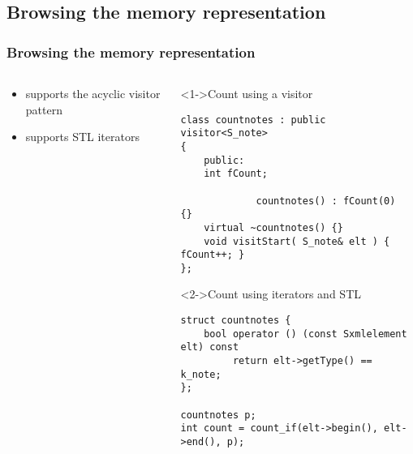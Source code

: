 \documentclass{beamer}
\begin{document}
\subsection{Browsing the memory representation}
\begin{frame}[fragile]
	\frametitle{Browsing the memory representation}

	\begin{columns}
		\begin{column}[c]{50mm}
		\begin{itemize}
			\item<1-> supports the acyclic visitor pattern
		\vspace{25mm}
			\item<2-> supports STL iterators
	   \end{itemize}
		\end{column}

		\begin{column}[c]{65mm}
		\begin{block}<1->{Count using a visitor} 
\begin{lstlisting}
class countnotes : public visitor<S_note>
{
    public:
    int fCount;

             countnotes() : fCount(0)	{}
    virtual ~countnotes() {}
    void visitStart( S_note& elt ) { fCount++; }
};
\end{lstlisting}
		\end{block}

		\begin{block}<2->{Count using iterators and STL} 
\begin{lstlisting}
struct countnotes {
    bool operator () (const Sxmlelement elt) const
         return elt->getType() == k_note;
};

countnotes p;
int count = count_if(elt->begin(), elt->end(), p);
\end{lstlisting}
		\end{block}
		\end{column}
	\end{columns}
\end{frame}

\end{document}
